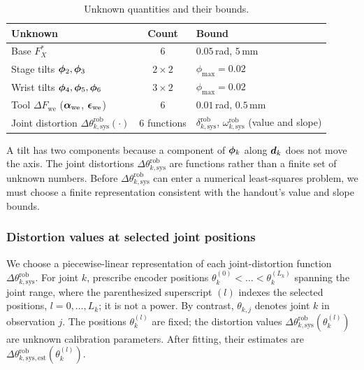\documentclass[../main.tex]{subfiles}
\begin{document}
\begin{table}[H]
\centering\small
\caption{Unknown quantities and their bounds.}\label{tab:unknowns}
\begin{tabular}{@{}>{\raggedright\arraybackslash}p{}c>{\raggedright\arraybackslash}p{}@{}}
\toprule
Unknown & Count & Bound \\\midrule
Base $F^*_X$ & 6 & $0.05$\,rad, $5$\,mm \\
Stage tilts $\bm{\phi}_2,\bm{\phi}_3$ & $2\times2$ & $\phi_{\max}=0.02$ \\
Wrist tilts $\bm{\phi}_4,\bm{\phi}_5,\bm{\phi}_6$ & $3\times2$ & $\phi_{\max}=0.02$ \\
Tool $\Delta F_{\mathrm{we}}$ ($\bm{\alpha}_{\mathrm{we}}$, $\bm{\epsilon}_{\mathrm{we}}$) & 6 & $0.01$\,rad, $0.5$\,mm \\
Joint distortion $\Delta\theta^{\mathrm{rob}}_{k,\mathrm{sys}}(\cdot)$ & 6 functions & $\delta^{\mathrm{rob}}_{k,\mathrm{sys}}$, $\omega^{\mathrm{rob}}_{k,\mathrm{sys}}$ (value and slope) \\
\bottomrule
\end{tabular}
\end{table}
A tilt has two components because a component of $\bm{\phi}_k$ along $\bm{d}_k$ does not move the axis. The joint distortions $\Delta\theta^{\mathrm{rob}}_{k,\mathrm{sys}}$ are functions rather than a finite set of unknown numbers. Before $\Delta\theta^{\mathrm{rob}}_{k,\mathrm{sys}}$ can enter a numerical least-squares problem, we must choose a finite representation consistent with the handout's value and slope bounds.

\subsubsection{Distortion values at selected joint positions}\label{sec:math-model}
We choose a piecewise-linear representation of each joint-distortion function $\Delta\theta^{\mathrm{rob}}_{k,\mathrm{sys}}$. For joint $k$, prescribe encoder positions $\theta_k^{(0)}<\dots<\theta_k^{(L_k)}$ spanning the joint range, where the parenthesized superscript $(l)$ indexes the selected positions, $l=0,\dots,L_k$; it is not a power. By contrast, $\theta_{k,j}$ denotes joint $k$ in observation $j$. The positions $\theta_k^{(l)}$ are fixed; the distortion values $\Delta\theta^{\mathrm{rob}}_{k,\mathrm{sys}}(\theta_k^{(l)})$ are unknown calibration parameters. After fitting, their estimates are $\Delta\theta^{\mathrm{rob}}_{k,\mathrm{sys},\mathrm{est}}(\theta_k^{(l)})$.
\end{document}
